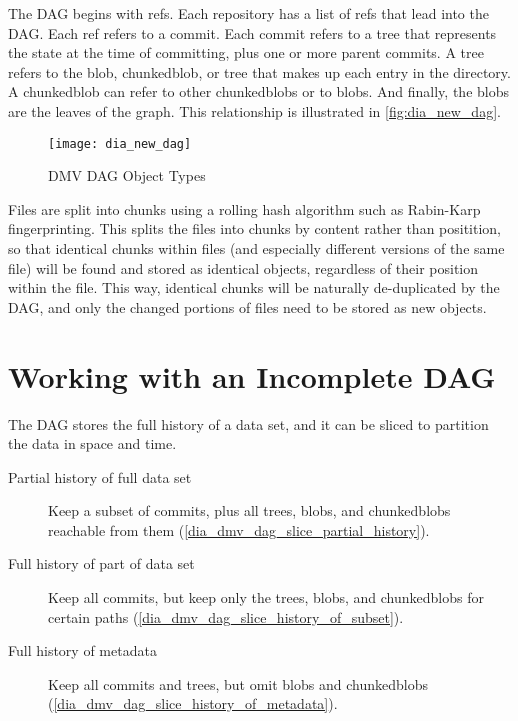 The DAG begins with refs. Each repository has a list of refs that lead into the
DAG. Each ref refers to a commit. Each commit refers to a \gls{tree} that
represents the state at the time of committing, plus one or more parent commits.
A \gls{tree} refers to the \gls{blob}, \gls{chunkedblob}, or \gls{tree} that
makes up each entry in the directory. A \gls{chunkedblob} can refer to other
\glspl{chunkedblob} or to \glspl{blob}. And finally, the \glspl{blob} are the
leaves of the graph. This relationship is illustrated in
\autoref{fig:dia_new_dag}.

\begin{figure}[]
    \centering
        \texttt{[image: dia\_new\_dag]}
    \caption{DMV DAG Object Types}
    \label{fig:dia_new_dag}
\end{figure}


Files are split into chunks using a rolling hash algorithm such as Rabin-Karp
fingerprinting\cite{rabin_karp_fingerprinting}. This splits the files into
chunks by content rather than positition, so that identical chunks within files
(and especially different versions of the same file) will be found and stored as
identical objects, regardless of their position within the file. This way,
identical chunks will be naturally de-duplicated by the DAG, and only the
changed portions of files need to be stored as new objects.

%


\section{Working with an Incomplete DAG}

The DAG stores the full history of a data set, and it can be sliced to partition
the data in space and time.

\begin{description}

    \item[Partial history of full data set] Keep a subset of commits, plus all
        \glspl{tree}, \glspl{blob}, and \glspl{chunkedblob} reachable from them
        (\autoref{dia_dmv_dag_slice_partial_history}).

    \item[Full history of part of data set] Keep all commits, but keep only the
        \glspl{tree}, \glspl{blob}, and \glspl{chunkedblob} for certain paths
        (\autoref{dia_dmv_dag_slice_history_of_subset}).

    \item[Full history of metadata] Keep all commits and \glspl{tree}, but omit
        \glspl{blob} and \glspl{chunkedblob}
        (\autoref{dia_dmv_dag_slice_history_of_metadata}).

\end{description}

